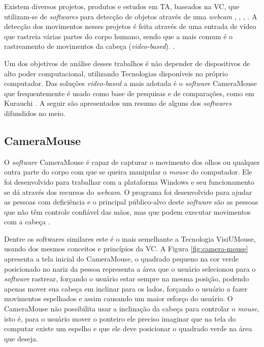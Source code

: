 Existem diversos projetos, produtos e estudos em TA, baseados na VC, que utilizam-se de \textit{softwares} para detecção de objetos através de uma \textit{webcam} \cite{ramos2016letras} , \cite{gips2000camera}, \cite{bian2016facial}, \cite{marnik2014blinkmouse}. A detecção dos movimentos nesses projetos é feita através de uma entrada de vídeo que rastreia várias partes do corpo humano, sendo que a mais comum é o rastreamento de movimentos da cabeça (\textit{video-based}). \cite{al2013eye-UPPERCASE}. 

Um dos objetivos de análise desses trabalhos é não depender de dispositivos de alto poder computacional, utilizando Tecnologias disponíveis no próprio computador. Das soluções \textit{video-based} a mais adotada é o \textit{software} CameraMouse \cite{gips2000camera} que frequentemente é usado como base de pesquisas e de comparações, como em Kurauchi \cite{kurauchi2015hmagic}. A seguir são apresentados um resumo de alguns dos \textit{softwares} difundidos no meio.

\subsection{CameraMouse}
O \textit{software} CameraMouse é capaz de capturar o movimento dos olhos ou qualquer outra parte do corpo com que se queira manipular o \textit{mouse} do computador. Ele foi desenvolvido para trabalhar com a plataforma Windows e seu funcionamento se dá através dos recursos do \textit{webcam}. O programa foi desenvolvido para ajudar as pessoas com deficiência e o principal público-alvo deste \textit{software} são as pessoas que não têm controle confiável das mãos, mas que podem executar movimentos com a cabeça .

Dentre os softwares similares este é o mais semelhante a Tecnologia VisiUMouse, usando dos mesmos conceitos e princípios da VC. A Figura \ref{fig:camera-mouse} apresenta a tela inicial do CameraMouse, o quadrado pequeno na cor verde posicionado no nariz da pessoa representa a área que o usuário selecionou para o \textit{software} rastrear, forçando o usuário estar sempre na mesma posição, podendo apenas mover sua cabeça em inclinar para os lados, forçando o usuário a fazer movimentos espelhados  e assim causando um maior esforço do usuário. O CameraMouse não possibilita usar a inclinação da cabeça para controlar o \textit{mouse}, isto é, para o usuário mover o ponteiro ele preciso imaginar que na tela do computar existe um espelho e que ele deve posicionar o quadrado verde na área que deseja.

